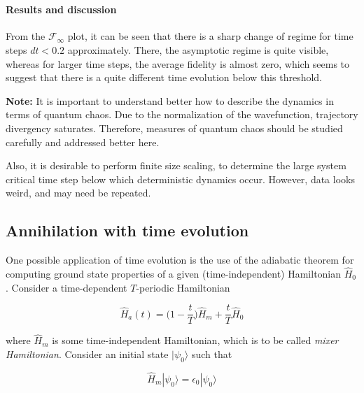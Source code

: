     \begin{center}
    \end{center}
    { \hspace*{\fill} \\}
    
    \hypertarget{results-and-discussion}{%
\paragraph{Results and discussion}\label{results-and-discussion}}

From the \(\mathcal{F}_{\infty}\) plot, it can be seen that there is a
sharp change of regime for time steps \(dt < 0.2\) approximately. There,
the asymptotic regime is quite visible, whereas for larger time steps,
the average fidelity is almost zero, which seems to suggest that there
is a quite different time evolution below this threshold.

\textbf{Note:} It is important to understand better how to describe the
dynamics in terms of quantum chaos. Due to the normalization of the
wavefunction, trajectory divergency saturates. Therefore, measures of
quantum chaos should be studied carefully and addressed better here.

Also, it is desirable to perform finite size scaling, to determine the
large system critical time step below which deterministic dynamics
occur. However, data looks weird, and may need be repeated.

    \hypertarget{annihilation-with-time-evolution}{%
\subsection{Annihilation with time
evolution}\label{annihilation-with-time-evolution}}

One possible application of time evolution is the use of the adiabatic
theorem for computing ground state properties of a given
(time-independent) Hamiltonian \(\hat{H}_0\). Consider a time-dependent
\(T\)-periodic Hamiltonian

\[
\hat{H}_a(t) = \big(1 - \frac{t}{T}\big)\hat{H}_m + \frac{t}{T}\hat{H}_0 
\]

where \(\hat{H}_m\) is some time-independent Hamiltonian, which is to be
called \emph{mixer Hamiltonian}. Consider an initial state
\(|\psi_0\rangle\) such that

\[
\hat{H}_m|\psi_0\rangle = \epsilon_0 |\psi_0\rangle
\]


